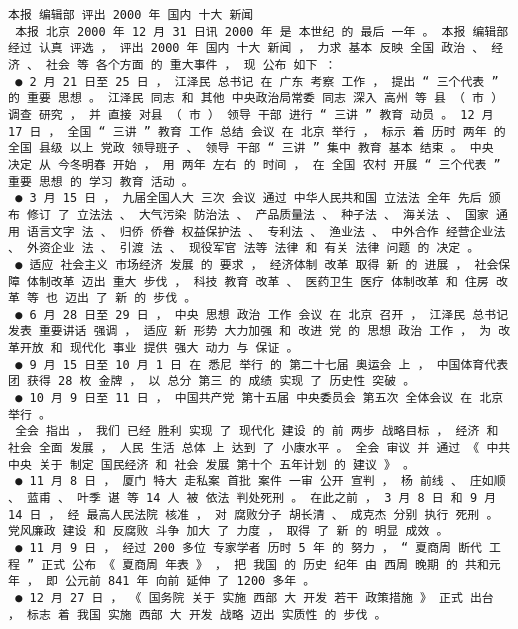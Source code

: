 \documentclass{article}
\begin{document}
\begin{Verbatim}[commandchars=\\\{\}]
 本报 编辑部 评出 2000 年 国内 十大 新闻 
 本报 北京 2000 年 12 月 31 日讯 2000 年 是 本世纪 的 最后 一年 。 本报 编辑部 经过 认真 评选 ， 评出 2000 年 国内 十大 新闻 ， 力求 基本 反映 全国 政治 、 经济 、 社会 等 各个方面 的 重大事件 ， 现 公布 如下 ： 
 ● 2 月 21 日至 25 日 ， 江泽民 总书记 在 广东 考察 工作 ， 提出 “ 三个代表 ” 的 重要 思想 。 江泽民 同志 和 其他 中央政治局常委 同志 深入 高州 等 县 （ 市 ） 调查 研究 ， 并 直接 对县 （ 市 ） 领导 干部 进行 “ 三讲 ” 教育 动员 。 12 月 17 日 ， 全国 “ 三讲 ” 教育 工作 总结 会议 在 北京 举行 ， 标示 着 历时 两年 的 全国 县级 以上 党政 领导班子 、 领导 干部 “ 三讲 ” 集中 教育 基本 结束 。 中央 决定 从 今冬明春 开始 ， 用 两年 左右 的 时间 ， 在 全国 农村 开展 “ 三个代表 ” 重要 思想 的 学习 教育 活动 。 
 ● 3 月 15 日 ， 九届全国人大 三次 会议 通过 中华人民共和国 立法法 全年 先后 颁布 修订 了 立法法 、 大气污染 防治法 、 产品质量法 、 种子法 、 海关法 、 国家 通用 语言文字 法 、 归侨 侨眷 权益保护法 、 专利法 、 渔业法 、 中外合作 经营企业法 、 外资企业 法 、 引渡 法 、 现役军官 法等 法律 和 有关 法律 问题 的 决定 。 
 ● 适应 社会主义 市场经济 发展 的 要求 ， 经济体制 改革 取得 新 的 进展 ， 社会保障 体制改革 迈出 重大 步伐 ， 科技 教育 改革 、 医药卫生 医疗 体制改革 和 住房 改革 等 也 迈出 了 新 的 步伐 。 
 ● 6 月 28 日至 29 日 ， 中央 思想 政治 工作 会议 在 北京 召开 ， 江泽民 总书记 发表 重要讲话 强调 ， 适应 新 形势 大力加强 和 改进 党 的 思想 政治 工作 ， 为 改革开放 和 现代化 事业 提供 强大 动力 与 保证 。 
 ● 9 月 15 日至 10 月 1 日 在 悉尼 举行 的 第二十七届 奥运会 上 ， 中国体育代表团 获得 28 枚 金牌 ， 以 总分 第三 的 成绩 实现 了 历史性 突破 。 
 ● 10 月 9 日至 11 日 ， 中国共产党 第十五届 中央委员会 第五次 全体会议 在 北京 举行 。 
 全会 指出 ， 我们 已经 胜利 实现 了 现代化 建设 的 前 两步 战略目标 ， 经济 和 社会 全面 发展 ， 人民 生活 总体 上 达到 了 小康水平 。 全会 审议 并 通过 《 中共中央 关于 制定 国民经济 和 社会 发展 第十个 五年计划 的 建议 》 。 
 ● 11 月 8 日 ， 厦门 特大 走私案 首批 案件 一审 公开 宣判 ， 杨 前线 、 庄如顺 、 蓝甫 、 叶季 谌 等 14 人 被 依法 判处死刑 。 在此之前 ， 3 月 8 日 和 9 月 14 日 ， 经 最高人民法院 核准 ， 对 腐败分子 胡长清 、 成克杰 分别 执行 死刑 。 党风廉政 建设 和 反腐败 斗争 加大 了 力度 ， 取得 了 新 的 明显 成效 。 
 ● 11 月 9 日 ， 经过 200 多位 专家学者 历时 5 年 的 努力 ， “ 夏商周 断代 工程 ” 正式 公布 《 夏商周 年表 》 ， 把 我国 的 历史 纪年 由 西周 晚期 的 共和元年 ， 即 公元前 841 年 向前 延伸 了 1200 多年 。 
 ● 12 月 27 日 ， 《 国务院 关于 实施 西部 大 开发 若干 政策措施 》 正式 出台 ， 标志 着 我国 实施 西部 大 开发 战略 迈出 实质性 的 步伐 。 

\end{Verbatim}
\end{document}
